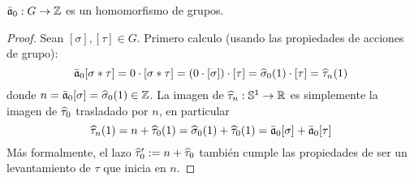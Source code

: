 \begin{ejercicio}\label{ej:35}
  $\bar{\mathfrak{a}}_0:G\rightarrow\mathbb{Z}$ es un homomorfismo de grupos.
\end{ejercicio}
\begin{proof}%
  Sean $[\sigma],[\tau]\in G$. Primero calculo
  (usando las propiedades de acciones de grupo):
  \[
    \bar{\mathfrak{a}}_0[\sigma*\tau]=
    0\cdot[\sigma*\tau]=
    (0\cdot[\sigma])\cdot[\tau]=
    \widehat{ \sigma }_0(1) \cdot [\tau]=
    \widehat{ \tau }_n(1)
  \]
  donde $n=\bar{\mathfrak{a}}_0[\sigma]=\widehat{ \sigma }_0(1)\in\mathbb{Z}$. La imagen de $\widehat{ \tau }_n:\mathbb{S}^1\rightarrow\mathbb{R}$
  es simplemente la imagen de $\widehat{ \tau }_0$ trasladado por $n$, en particular
  \[
    \widehat{ \tau }_n(1)=
    n+\widehat{ \tau }_0(1)=
    \widehat{ \sigma }_0(1)+\widehat{ \tau }_0(1)=
    \bar{\mathfrak{a}}_0[\sigma]+\bar{\mathfrak{a}}_0[\tau]
  \]
  M\'as formalmente, el lazo $\widehat{ \tau }_0':=n+\widehat{ \tau }_0$ tambi\'en cumple las
  propiedades de ser un levantamiento de $\tau$ que inicia en $n$.
\end{proof}%

